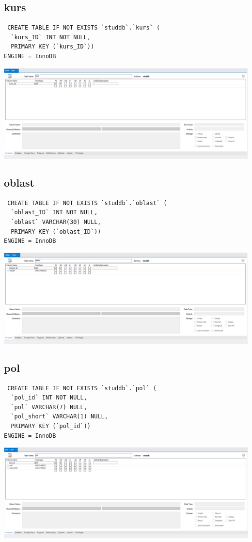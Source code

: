 \documentclass[a4paper, 12pt]{article}
\begin{document}
\subsection{kurs}
\begin{lstlisting}
 CREATE TABLE IF NOT EXISTS `studdb`.`kurs` (
  `kurs_ID` INT NOT NULL,
  PRIMARY KEY (`kurs_ID`))
ENGINE = InnoDB 
\end{lstlisting}
\includegraphics[width=\textwidth]{2-8.png}

\subsection{oblast}
\begin{lstlisting}
 CREATE TABLE IF NOT EXISTS `studdb`.`oblast` (
  `oblast_ID` INT NOT NULL,
  `oblast` VARCHAR(30) NULL,
  PRIMARY KEY (`oblast_ID`))
ENGINE = InnoDB 
\end{lstlisting}
\includegraphics[width=\textwidth]{2-9.png}

\subsection{pol}
\begin{lstlisting}
 CREATE TABLE IF NOT EXISTS `studdb`.`pol` (
  `pol_id` INT NOT NULL,
  `pol` VARCHAR(7) NULL,
  `pol_short` VARCHAR(1) NULL,
  PRIMARY KEY (`pol_id`))
ENGINE = InnoDB 
\end{lstlisting}
\includegraphics[width=\textwidth]{2-10.png}
\end{document}
